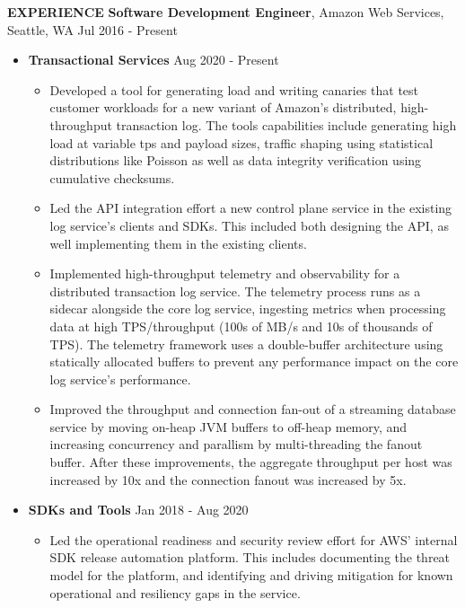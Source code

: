 \documentclass[10pt, letterpaper]{article}
\begin{document}
\textbf{EXPERIENCE}
\smallskip
\newline
\textbf{Software Development Engineer}, Amazon Web Services, Seattle, WA \hfill Jul 2016 - Present
\begin{itemize}
\item \textbf{Transactional Services} \hfill Aug 2020 - Present
  \begin{itemize}[label=$\bullet$]
    \item Developed a tool for generating load and writing canaries that test customer workloads for a new variant of Amazon's distributed, 
      high-throughput transaction log. The tools capabilities include generating high load at variable tps and payload sizes, traffic shaping 
      using statistical distributions like Poisson as well as data integrity verification using cumulative checksums.
    \item Led the API integration effort a new control plane service in the existing log service's clients and SDKs. This included both designing
      the API, as well implementing them in the existing clients.
    \item Implemented high-throughput telemetry and observability for a distributed transaction log service. The telemetry process runs as a
      sidecar alongside the core log service, ingesting metrics when processing data at high TPS/throughput (100s of MB/s and 10s of thousands of TPS).
      The telemetry framework uses a double-buffer architecture using statically allocated buffers to prevent any performance impact on the core log
      service's performance.
    \item Improved the throughput and connection fan-out of a streaming database service by moving on-heap JVM buffers to off-heap memory, and increasing
      concurrency and parallism by multi-threading the fanout buffer. After these improvements, the aggregate throughput per host was increased by 10x and
      the connection fanout was increased by 5x.
  \end{itemize}
\item \textbf{SDKs and Tools} \hfill Jan 2018 - Aug 2020
  \begin{itemize}[label=$\bullet$]
    \item Led the operational readiness and security review effort for AWS' internal SDK release automation platform. This includes documenting the threat model
      for the platform, and identifying and driving mitigation for known operational and resiliency gaps in the service. 

\end{itemize}
\end{itemize}
\end{document}
